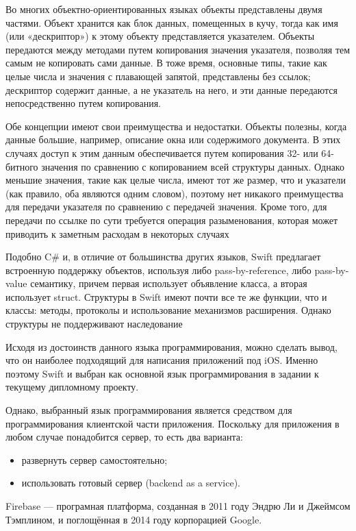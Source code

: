 Во многих объектно-ориентированных языках объекты представлены двумя частями. Объект хранится как блок данных, помещенных в кучу, тогда как имя (или «дескриптор») к этому объекту представляется указателем. Объекты передаются между методами путем копирования значения указателя, позволяя тем самым не копировать сами данные. В тоже время, основные типы, такие как целые числа и значения с плавающей запятой, представлены без ссылок; дескриптор содержит данные, а не указатель на него, и эти данные передаются непосредственно путем копирования.

Обе концепции имеют свои преимущества и недостатки. Объекты полезны, когда данные большие, например, описание окна или содержимого документа. В этих случаях доступ к этим данным обеспечивается путем копирования 32- или 64-битного значения по сравнению с копированием всей структуры данных. Однако меньшие значения, такие как целые числа, имеют тот же размер, что и указатели (как правило, оба являются одним словом), поэтому нет никакого преимущества для передачи указателя по сравнению с передачей значения. Кроме того, для передачи по ссылке по сути требуется операция разыменования, которая может приводить к заметным расходам в некоторых случаях

Подобно C\# и, в отличие от большинства других языков, Swift предлагает встроенную поддержку объектов, используя либо pass-by-reference, либо pass-by-value семантику, причем первая использует объявление класса, а вторая использует struct. Структуры в Swift имеют почти все те же функции, что и классы: методы, протоколы и использование механизмов расширения. Однако структуры не поддерживают наследование

Исходя из достоинств данного языка программирования, можно сделать вывод, что он наиболее подходящий для написания приложений под iOS. Именно поэтому Swift и выбран как основной язык программирования в задании к текущему дипломному проекту.

Однако, выбранный язык программирования является средством для программирования клиентской части приложения. Поскольку для приложения в любом случае понадобится сервер, то есть два варианта: 

\begin{itemize}
	\item развернуть сервер самостоятельно;
	\item использовать готовый сервер (backend as a service).
\end{itemize}

Firebase — програмная платформа, созданная в 2011 году Эндрю Ли и Джеймсом Тэмплином, и поглощённая в 2014 году корпорацией Google.

